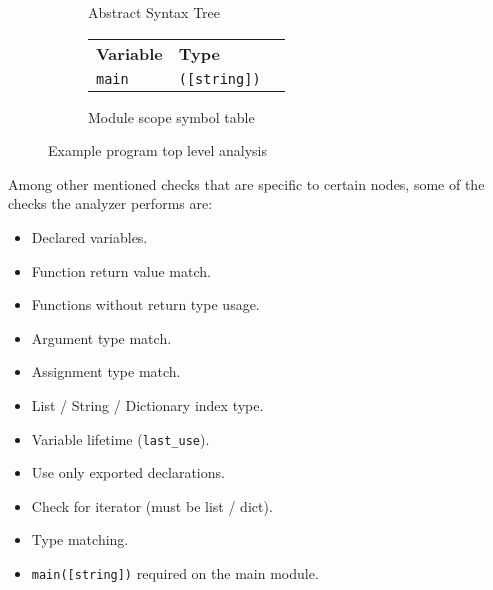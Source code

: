 \begin{figure}[H]
\begin{subfigure}{0.45\textwidth}
		\caption{Abstract Syntax Tree}
	\end{subfigure}
    \begin{subfigure}{0.45\textwidth}
		\centering
        \begin{tabular}{ l l l }
            \textbf{Variable} & \textbf{Type} \\
            \texttt{main} & \texttt{([string])} \\
		\end{tabular}
		\caption{Module scope symbol table}
	\end{subfigure}
	\caption{Example program top level analysis}
    \label{fig:ast_example}
\end{figure}

Among other mentioned checks that are specific to certain nodes, some of the checks the analyzer performs are:

\begin{itemize}
    \item Declared variables.
    \item Function return value match.
    \item Functions without return type usage.
    \item Argument type match.
    \item Assignment type match.
    \item List / String / Dictionary index type.
    \item Variable lifetime (\texttt{last\_use}).
    \item Use only exported declarations.
    \item Check for iterator (must be list / dict).
    \item Type matching.
    \item \texttt{main([string])} required on the main module.
\end{itemize}

